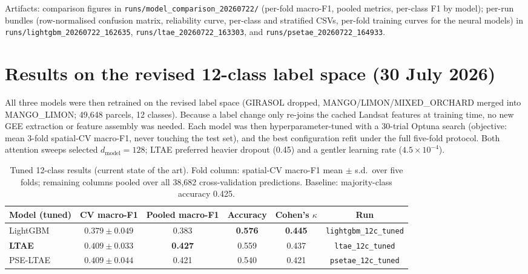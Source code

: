 \documentclass[11pt,a4paper]{article}
\begin{document}
Artifacts: comparison figures in \texttt{runs/model\_comparison\_20260722/} (per-fold
macro-F1, pooled metrics, per-class F1 by model); per-run bundles (row-normalised confusion
matrix, reliability curve, per-class and stratified CSVs, per-fold training curves for the
neural models) in \texttt{runs/lightgbm\_20260722\_162635}, \texttt{runs/ltae\_20260722\_163303},
and \texttt{runs/psetae\_20260722\_164933}.

\section{Results on the revised 12-class label space (30 July 2026)}
\label{sec:12c}

All three models were then retrained on the revised label space (GIRASOL dropped,
MANGO/LIMON/MIXED\_ORCHARD merged into MANGO\_LIMON; 49{,}648 parcels, 12 classes). Because a
label change only re-joins the cached Landsat features at training time, no new GEE extraction
or feature assembly was needed. Each model was then hyperparameter-tuned with a 30-trial Optuna
search (objective: mean 3-fold spatial-CV macro-F1, never touching the test set), and the best
configuration refit under the full five-fold protocol. Both attention sweeps selected
$d_{\text{model}}=128$; LTAE preferred heavier dropout (0.45) and a gentler learning rate
($4.5\times10^{-4}$).

\begin{table}[ht]
\centering\small
\caption{Tuned 12-class results (current state of the art). Fold column: spatial-CV macro-F1
mean $\pm$ s.d.\ over five folds; remaining columns pooled over all 38{,}682 cross-validation
predictions. Baseline: majority-class accuracy 0.425.}
\begin{tabular}{@{}lccccc@{}}
\toprule
Model (tuned) & CV macro-F1 & Pooled macro-F1 & Accuracy & Cohen's $\kappa$ & Run \\
\midrule
LightGBM  & $0.379 \pm 0.049$ & 0.383 & \textbf{0.576} & \textbf{0.445} & \texttt{lightgbm\_12c\_tuned} \\
\textbf{LTAE} & $0.409 \pm 0.033$ & \textbf{0.427} & 0.559 & 0.437 & \texttt{ltae\_12c\_tuned} \\
PSE-LTAE  & $0.409 \pm 0.044$ & 0.421 & 0.540 & 0.421 & \texttt{psetae\_12c\_tuned} \\
\bottomrule
\end{tabular}
\end{table}
\end{document}
